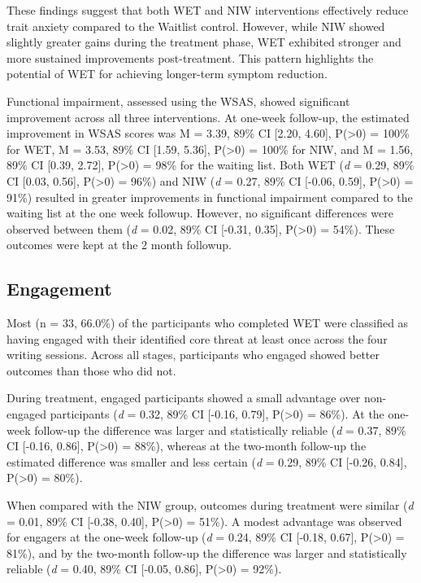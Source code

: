 \documentclass[
  man,floatsintext]{apa7}
\begin{document}
These findings suggest that both WET and NIW interventions effectively reduce trait anxiety compared to the Waitlist control.
However, while NIW showed slightly greater gains during the treatment phase, WET exhibited stronger and more sustained improvements post-treatment.
This pattern highlights the potential of WET for achieving longer-term symptom reduction.

Functional impairment, assessed using the WSAS, showed significant improvement across all three interventions.
At one-week follow-up, the estimated improvement in WSAS scores was M = 3.39, 89\% CI {[}2.20, 4.60{]}, P(\textgreater0) = 100\% for WET, M = 3.53, 89\% CI {[}1.59, 5.36{]}, P(\textgreater0) = 100\% for NIW, and M = 1.56, 89\% CI {[}0.39, 2.72{]}, P(\textgreater0) = 98\% for the waiting list.
Both WET (\emph{d} = 0.29, 89\% CI {[}0.03, 0.56{]}, P(\textgreater0) = 96\%) and NIW (\emph{d} = 0.27, 89\% CI {[}-0.06, 0.59{]}, P(\textgreater0) = 91\%) resulted in greater improvements in functional impairment compared to the waiting list at the one week followup.
However, no significant differences were observed between them (\emph{d} = 0.02, 89\% CI {[}-0.31, 0.35{]}, P(\textgreater0) = 54\%).
These outcomes were kept at the 2 month followup.

\subsection{Engagement}\label{engagement}

Most (n = 33, 66.0\%) of the participants who completed WET were classified as having engaged with their identified core threat at least once across the four writing sessions.
Across all stages, participants who engaged showed better outcomes than those who did not.

During treatment, engaged participants showed a small advantage over non-engaged participants (\emph{d} = 0.32, 89\% CI {[}-0.16, 0.79{]}, P(\textgreater0) = 86\%).
At the one-week follow-up the difference was larger and statistically reliable (\emph{d} = 0.37, 89\% CI {[}-0.16, 0.86{]}, P(\textgreater0) = 88\%), whereas at the two-month follow-up the estimated difference was smaller and less certain (\emph{d} = 0.29, 89\% CI {[}-0.26, 0.84{]}, P(\textgreater0) = 80\%).

When compared with the NIW group, outcomes during treatment were similar (\emph{d} = 0.01, 89\% CI {[}-0.38, 0.40{]}, P(\textgreater0) = 51\%).
A modest advantage was observed for engagers at the one-week follow-up (\emph{d} = 0.24, 89\% CI {[}-0.18, 0.67{]}, P(\textgreater0) = 81\%), and by the two-month follow-up the difference was larger and statistically reliable (\emph{d} = 0.40, 89\% CI {[}-0.05, 0.86{]}, P(\textgreater0) = 92\%).
\end{document}
